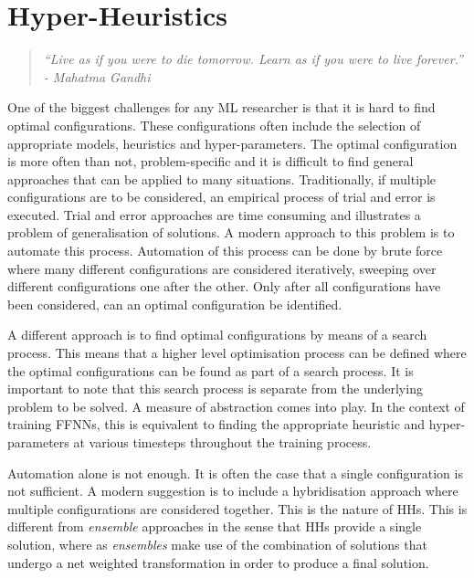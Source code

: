 \chapter{Hyper-Heuristics}
\label{chap:hhs}

\begin{quotation}
    \textit{``Live as if you were to die tomorrow. Learn as if you were to live forever.'' - Mahatma Gandhi}
\end{quotation}

One of the biggest challenges for any \ac{ML} researcher is that it is hard to find optimal configurations. These configurations often include the selection of appropriate models, heuristics and hyper-parameters. The optimal configuration is more often than not, problem-specific and it is difficult to find general approaches that can be applied to many situations. Traditionally, if multiple configurations are to be considered, an empirical process of trial and error is executed. Trial and error approaches are time consuming and illustrates a problem of generalisation of solutions. A modern approach to this problem is to automate this process. Automation of this process can be done by brute force where many different configurations are considered iteratively, sweeping over different configurations one after the other. Only after all configurations have been considered, can an optimal configuration be identified.

A different approach is to find optimal configurations by means of a search process. This means that a higher level optimisation process can be defined where the optimal configurations can be found as part of a search process. It is important to note that this search process is separate from the underlying problem to be solved. A measure of abstraction comes into play. In the context of training \acp{FFNN}, this is equivalent to finding the appropriate heuristic and hyper-parameters at various timesteps throughout the training process.

Automation alone is not enough. It is often the case that a single configuration is not sufficient. A modern suggestion is to include a hybridisation approach where multiple configurations are considered together. This is the nature of \acp{HH}. This is different from \textit{ensemble} \cite{ref:dietterich:2002} approaches in the sense that \acp{HH} provide a single solution, where as \textit{ensembles} make use of the combination of solutions that undergo a net weighted transformation in order to produce a final solution.

